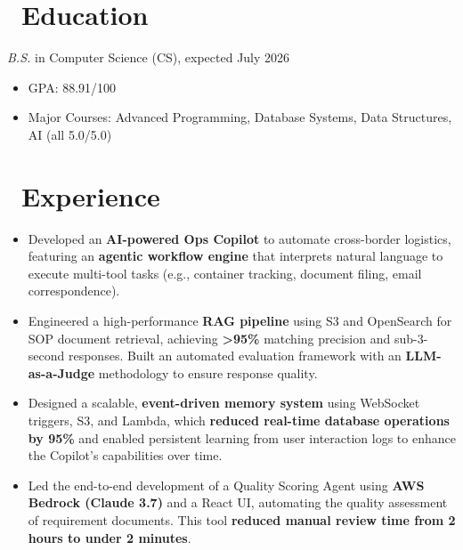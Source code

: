 \documentclass{resume}
\begin{document}



\section{\faGraduationCap\ Education}
\textit{B.S.} in Computer Science (CS), expected July 2026
\begin{itemize}
  \item GPA: 88.91/100
  \item Major Courses: Advanced Programming, Database Systems, Data Structures, AI (all 5.0/5.0)
\end{itemize}

\section{\faUsers\ Experience}

\begin{itemize}
    \item Developed an \textbf{AI-powered Ops Copilot} to automate cross-border logistics, featuring an \textbf{agentic workflow engine} that interprets natural language to execute multi-tool tasks (e.g., container tracking, document filing, email correspondence).
    \item Engineered a high-performance \textbf{RAG pipeline} using S3 and OpenSearch for SOP document retrieval, achieving \textbf{>95\%} matching precision and sub-3-second responses. Built an automated evaluation framework with an \textbf{LLM-as-a-Judge} methodology to ensure response quality.
    \item Designed a scalable, \textbf{event-driven memory system} using WebSocket triggers, S3, and Lambda, which \textbf{reduced real-time database operations by 95\%} and enabled persistent learning from user interaction logs to enhance the Copilot's capabilities over time.
    \item Led the end-to-end development of a Quality Scoring Agent using \textbf{AWS Bedrock (Claude 3.7)} and a React UI, automating the quality assessment of requirement documents. This tool \textbf{reduced manual review time from 2 hours to under 2 minutes}.
\end{itemize}
\end{document}
